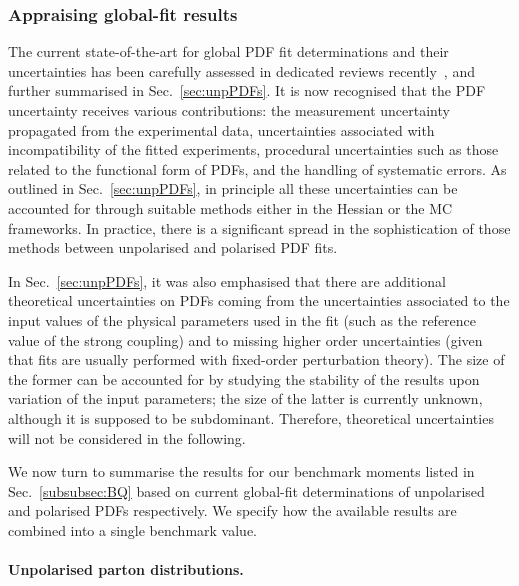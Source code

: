 \subsubsection{Appraising global-fit results}
\label{subsubsec:GPDFfits}

The current state-of-the-art for global PDF fit determinations and their 
uncertainties has been carefully assessed in dedicated reviews
recently~\cite{Forte:2013wc,Jimenez-Delgado:2013sma}, and further 
summarised in Sec.~\ref{sec:unpPDFs}. 
%
It is now recognised that the PDF uncertainty receives various contributions: 
the measurement uncertainty propagated from the
experimental data, uncertainties associated with incompatibility of the 
fitted experiments, procedural uncertainties such as those related to the
functional form of PDFs, and the handling of systematic errors.
%
As outlined in Sec.~\ref{sec:unpPDFs}, in principle all these uncertainties 
can be accounted for through suitable methods either in the Hessian or the 
MC frameworks.
%
In practice, there is a significant spread in the sophistication 
of those methods between unpolarised and polarised PDF fits.

In Sec.~\ref{sec:unpPDFs}, it was also emphasised that there are additional 
theoretical uncertainties on PDFs coming from the uncertainties associated to 
the input values of the physical parameters used in the fit (such as the 
reference value of the strong coupling) and to missing higher order
uncertainties (given that fits are usually performed with fixed-order
perturbation theory).
%
The size of the former can be accounted for by studying the stability of the 
results upon variation of the input parameters; the size of the latter is
currently unknown, although it is supposed to be subdominant.
%
Therefore, theoretical uncertainties will not be considered in the following.

We now turn to summarise the results for our benchmark moments listed in 
Sec.~\ref{subsubsec:BQ} based on current global-fit determinations of
unpolarised and polarised PDFs respectively.
%
We specify how the
available results are combined into a single benchmark value.

\paragraph{Unpolarised parton distributions.}

